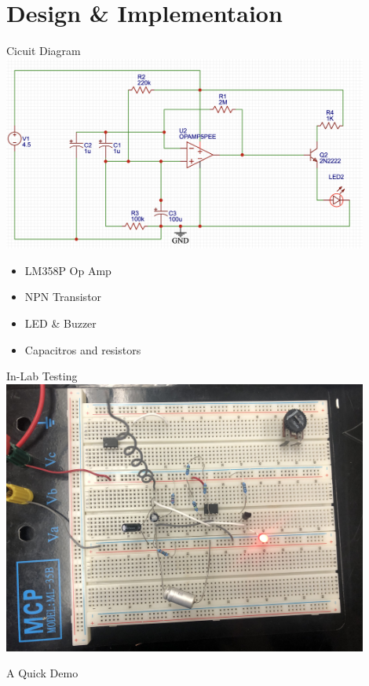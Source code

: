 \documentclass{loyola-beamer}
\begin{document}
\section{Design \& Implementaion}

\begin{frame}{Cicuit Diagram}
	\includegraphics[width=0.9\textwidth]{../detector-circuit.png}

	\begin{itemize}
		\item LM358P Op Amp
		\item NPN Transistor
		\item LED \& Buzzer
		\item Capacitros and resistors
	\end{itemize}
\end{frame}


\begin{frame}{In-Lab Testing}
	\includegraphics[width=0.9\textwidth]{../breadboard.jpeg}
\end{frame}


\begin{titleframe}{A Quick Demo}
\end{titleframe}
\end{document}
